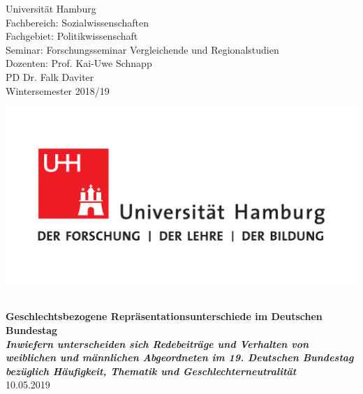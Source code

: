 \documentclass[12pt, 
    twoside=false, 
    bibliography=totoc, 
    numbers=endperiod, 
    headings=normal, 
    toc=chapterentrydotfill
    ]{scrbook}
\begin{document}
\begin{titlepage}
    \begin{minipage}[t]{0.6\textwidth}
    \flushleft 
    Universität Hamburg \\
    Fachbereich: Sozialwissenschaften \\
    Fachgebiet: Politikwissenschaft \\
    Seminar: Forschungsseminar Vergleichende und Regionalstudien \\ 
    Dozenten: Prof. Kai-Uwe Schnapp \\
    PD Dr. Falk Daviter \\
    Wintersemester 2018/19 \\
    \end{minipage}
    \hfill
    \begin{minipage}[t][1.7cm][b]{0.35\textwidth}
    \includegraphics[width=\textwidth]{images/UHH-Logo_2010_Farbe_CMYK.pdf}
    \end{minipage}
    
    \vspace*{\fill}
    \begin{center}
	\vspace{1cm} \vspace{0.2cm} \\
	\textbf{\Large Geschlechtsbezogene Repräsentationsunterschiede im Deutschen Bundestag \\
	\vspace {0,5cm} \small\emph{Inwiefern unterscheiden sich Redebeiträge und Verhalten von weiblichen und männlichen Abgeordneten im 19. Deutschen Bundestag bezüglich Häufigkeit, Thematik und Geschlechterneutralität}} \\
	\vspace{0.5cm}
	10.05.2019
	\end{center}
    \vspace*{\fill}
	

\end{titlepage}
\end{document}
